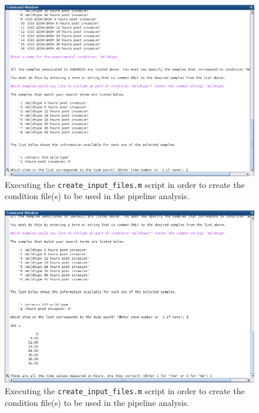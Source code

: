 \documentclass[final,letterpaper,twoside,12pt]{article}
\begin{document}
\begin{figure}[h]
\includegraphics[width=\textwidth]{create_files_7}
\caption{Executing the \texttt{create\_input\_files.m} script in order to create the condition file(s) to be used in the pipeline analysis.}
\label{figure:create_files_7}
\end{figure}

\begin{figure}[h]
\includegraphics[width=\textwidth]{create_files_8}
\caption{Executing the \texttt{create\_input\_files.m} script in order to create the condition file(s) to be used in the pipeline analysis.}
\label{figure:create_files_8}
\end{figure}
\end{document}
